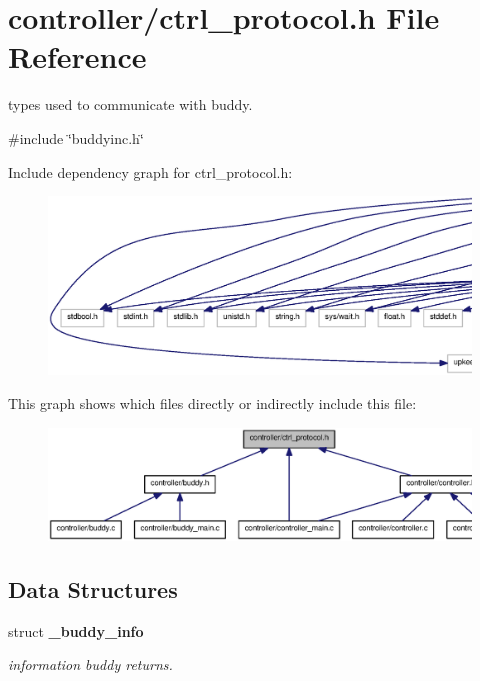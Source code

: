 \section{controller/ctrl\_\-protocol.h File Reference}
\label{ctrl__protocol_8h}


types used to communicate with buddy.  


{\ttfamily \#include \char`\"{}buddyinc.h\char`\"{}}\par
Include dependency graph for ctrl\_\-protocol.h:
\nopagebreak
\begin{figure}[H]
\begin{center}
\leavevmode
\includegraphics[width=400pt]{ctrl__protocol_8h__incl}
\end{center}
\end{figure}
This graph shows which files directly or indirectly include this file:\nopagebreak
\begin{figure}[H]
\begin{center}
\leavevmode
\includegraphics[width=400pt]{ctrl__protocol_8h__dep__incl}
\end{center}
\end{figure}
\subsection*{Data Structures}
\begin{DoxyCompactItemize}
\item 
struct {\bf \_\-buddy\_\-info}
\begin{DoxyCompactList}\small\item\em information buddy returns. \end{DoxyCompactList}\end{DoxyCompactItemize}
